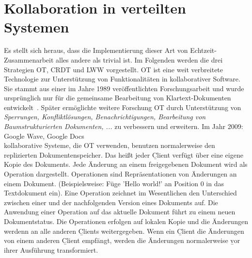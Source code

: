 \section{Kollaboration in verteilten Systemen}
Es stellt sich heraus, dass die Implementierung dieser Art von Echtzeit-Zusammenarbeit alles andere als trivial ist.
Im Folgenden werden die drei Strategien \gls{OT}, \gls{CRDT} und \gls{LWW} vorgestellt.
%
%
  \gls{OT} ist eine weit verbreitete Technologie zur Unterstützung von Funktionalitäten in \gls{kollaborativ}er Software. Sie stammt aus einer im Jahre 1989 veröffentlichten Forschungsarbeit und wurde ursprünglich nur für die gemeinsame Bearbeitung von Klartext-Dokumenten entwickelt~\cite{ot_paper}. Später ermöglichte weitere Forschung \gls{OT} durch Unterstützung von \textit{Sperrungen, Konfliktlösungen, Benachrichtigungen, Bearbeitung von Baumstrukturierten Dokumenten, ...} zu verbessern und erweitern. Im Jahr 2009: Google Wave, Google Docs\\
\Gls{kollaborativ}e Systeme, die \gls{OT} verwenden, benutzen normalerweise den replizierten Dokumentenspeicher. Das heißt jeder \b{Client} verfügt über eine eigene Kopie des Dokuments.
Jede Änderung an einem freigegebenen Dokument wird als Operation dargestellt. Operationen sind Repräsentationen von Änderungen an einem Dokument. (Beispielsweise: Füge 'Hello world!' an Position 0 in das Textdokument ein).  Eine Operation zeichnet im Wesentlichen den Unterschied zwischen einer und der nachfolgenden Version eines Dokuments auf. Die Anwendung einer Operation auf das aktuelle Dokument führt zu einem neuen Dokumentstatus.
Die Operationen erfolgen auf lokalen Kopie und die Änderungen werdenn an alle anderen \b{Clients} weitergegeben.  Wenn ein \b{Client} die Änderungen von einem anderen \b{Client} empfängt, werden die Änderungen normalerweise \b{vor} ihrer Ausführung transformiert.
\\

